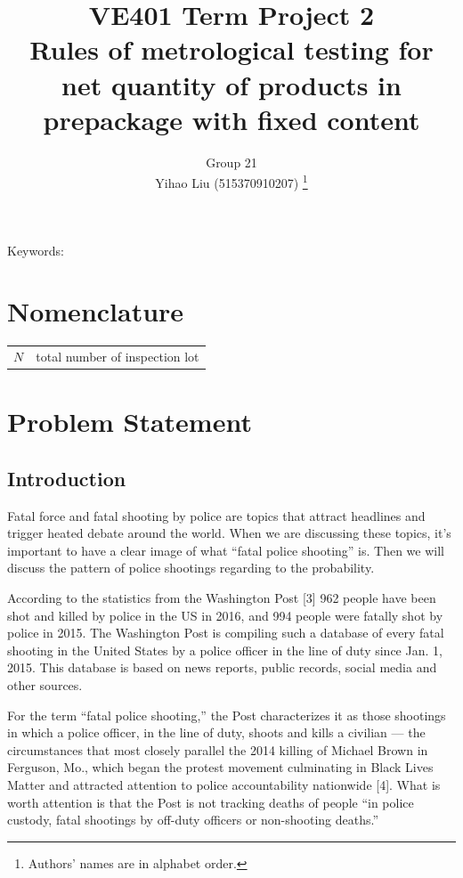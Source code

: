 \documentclass[conf]{new-aiaa}
\title{VE401 Term Project 2\\
Rules of metrological testing for net quantity of products in prepackage with fixed content}
\author{Group 21\\
Yihao Liu (515370910207)
\footnote{Authors' names are in alphabet order.}
}
\affil{University OF Michigan - Shanghai Jiao Tong University Joint Institute, Shanghai, China}
\begin{document}
\maketitle

\begin{abstract}
    
\end{abstract}

\vspace{11cm}
\noindent Keywords: 

\newpage

\tableofcontents
\newpage


\section{Nomenclature}

{\renewcommand\arraystretch{1.0}
\noindent\begin{longtable*}{@{}l @{\quad=\quad} l@{}}
$N$ & total number of inspection lot
\end{longtable*}}

\newpage

\section{Problem Statement}

\subsection{Introduction}

Fatal force and fatal shooting by police are topics that attract headlines and trigger heated debate around the world. When we are discussing these topics, it’s important to have a clear image of what ``fatal police shooting'' is. Then we will discuss the pattern of police shootings regarding to the probability. 

According to the statistics from the Washington Post [3] 962 people have been shot and killed by police in the US in 2016, and 994 people were fatally shot by police in 2015. The Washington Post is compiling such a database of every fatal shooting in the United States by a police officer in the line of duty since Jan. 1, 2015. This database is based on news reports, public records, social media and other sources.

For the term ``fatal police shooting,'' the Post characterizes it as those shootings in which a police officer, in the line of duty, shoots and kills a civilian — the circumstances that most closely parallel the 2014 killing of Michael Brown in Ferguson, Mo., which began the protest movement culminating in Black Lives Matter and attracted attention to police accountability nationwide [4]. What is worth attention is that the Post is not tracking deaths of people ``in police custody, fatal shootings by off-duty officers or non-shooting deaths.''
\end{document}
